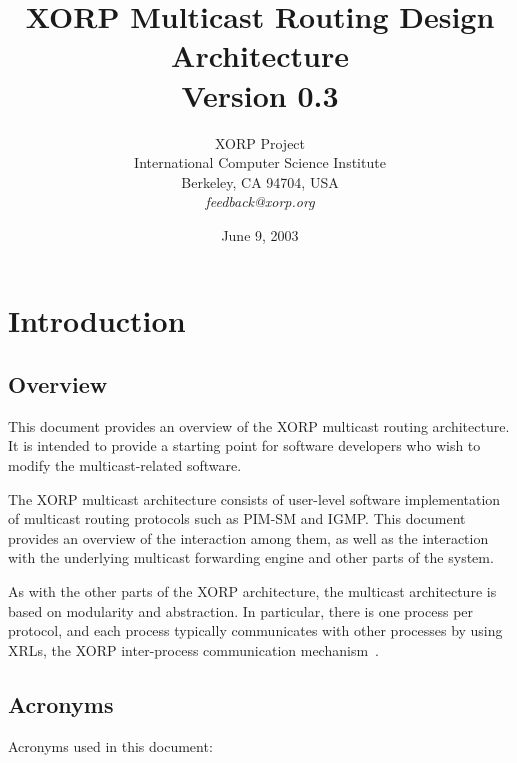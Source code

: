 \documentclass[11pt]{article}
\begin{document}
\title{XORP Multicast Routing Design Architecture \\
\vspace{1ex}
Version 0.3}
\author{ XORP Project					\\
	 International Computer Science Institute	\\
	 Berkeley, CA 94704, USA			\\
	 {\it feedback@xorp.org}
}
\date{June 9, 2003}

\maketitle

\thispagestyle{empty}


\section{Introduction}


\subsection{Overview}

This document provides an overview of the XORP multicast routing
architecture.  It is intended to provide a starting point for software
developers who wish to modify the multicast-related software.

The XORP multicast architecture consists of user-level software
implementation of multicast routing protocols such as PIM-SM and IGMP.
This document provides an overview of the interaction among them,
as well as the interaction with the underlying multicast forwarding
engine and other parts of the system.

As with the other parts of the XORP architecture, the multicast
architecture is based on modularity and abstraction.
In particular, there is one process per protocol, and each process
typically communicates with other processes by using XRLs, the XORP
inter-process communication mechanism~\cite{xorp:xrl}.

\subsection{Acronyms}

Acronyms used in this document:
\end{document}
